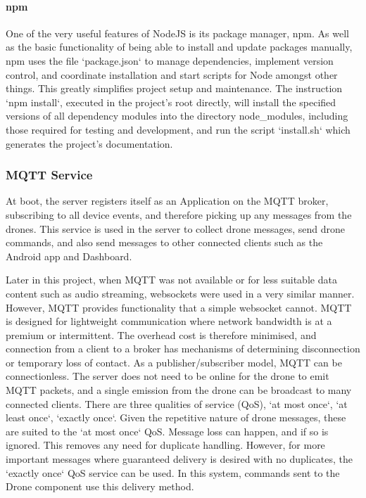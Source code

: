 \documentclass{article}
\begin{document}
\paragraph{npm}\label{npm}
One of the very useful features of NodeJS is its package manager, npm. As well as the basic functionality of being able to install and update packages manually, npm uses the file `package.json` to manage dependencies, implement version control, and coordinate installation and start scripts for Node amongst other things. This greatly simplifies project setup and maintenance. The instruction `npm install`, executed in the project's root directly, will install the specified versions of all dependency modules into the directory node\_modules, including those required for testing and development, and run the script `install.sh` which generates the project's documentation.   

\subsubsection{MQTT Service}
At boot, the server registers itself as an Application on the MQTT broker, subscribing to all device events, and therefore picking up any messages from the drones. This service is used in the server to collect drone messages, send drone commands, and also send messages to other connected clients such as the Android app and Dashboard.

Later in this project, when MQTT was not available or for less suitable data content such as audio streaming, websockets were used in a very similar manner. However, MQTT provides functionality that a simple websocket cannot. MQTT is designed for lightweight communication where network bandwidth is at a premium or intermittent\cite{mqttSpec}. The overhead cost is therefore minimised, and connection from a client to a broker has mechanisms of determining disconnection or temporary loss of contact. As a publisher/subscriber model, MQTT can be connectionless. The server does not need to be online for the drone to emit MQTT packets, and a single emission from the drone can be broadcast to many connected clients. There are three qualities of service (QoS), `at most once`, `at least once`, `exactly once`\cite{mqttSpec}. Given the repetitive nature of drone messages, these are suited to the `at most once` QoS. Message loss can happen, and if so is ignored. This removes any need for duplicate handling. However, for more important messages where guaranteed delivery is desired with no duplicates, the `exactly once` QoS service can be used. In this system, commands sent to the Drone component use this delivery method.
\end{document}
